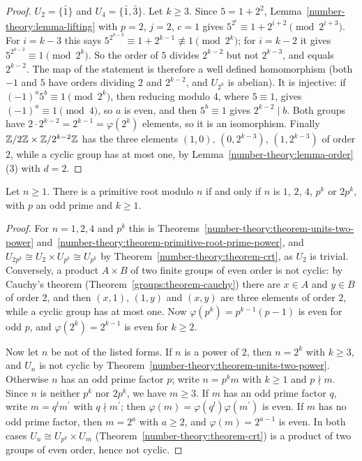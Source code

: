 \begin{proof}
$U_2 = \{\bar{1}\}$ and $U_4 = \{\bar{1}, \bar{3}\}$. Let $k \geq 3$. Since $5 = 1 + 2^2$, Lemma~\ref{number-theory:lemma-lifting} with $p = 2$, $j = 2$, $c = 1$ gives
$5^{2^i} \equiv 1 + 2^{i+2} \pmod{2^{i+3}}$. For $i = k - 3$ this says $5^{2^{k-3}} \equiv 1 + 2^{k-1} \not\equiv 1 \pmod{2^k}$; for $i = k - 2$ it gives $5^{2^{k-2}} \equiv 1 \pmod{2^k}$. So the order of
$5$ divides $2^{k-2}$ but not $2^{k-3}$, and equals $2^{k-2}$. The map of the statement is therefore a well defined homomorphism (both $-1$ and $5$ have orders dividing $2$ and $2^{k-2}$, and $U_{2^k}$ is
abelian). It is injective: if $(-1)^a5^b \equiv 1 \pmod{2^k}$, then reducing modulo $4$, where $5 \equiv 1$, gives $(-1)^a \equiv 1 \pmod 4$, so $a$ is even, and then $5^b \equiv 1$ gives $2^{k-2} \mid b$.
Both groups have $2 \cdot 2^{k-2} = 2^{k-1} = \varphi(2^k)$ elements, so it is an isomorphism. Finally $\mathbb{Z}/2\mathbb{Z} \times \mathbb{Z}/2^{k-2}\mathbb{Z}$ has the three elements $(1, 0)$, $(0, 2^{k-3})$, $(1, 2^{k-3})$ of
order $2$, while a cyclic group has at most one, by Lemma~\ref{number-theory:lemma-order}(3) with $d = 2$.
\end{proof}

\begin{theorem}[Gauss]\label{number-theory:theorem-primitive-roots}
Let $n \geq 1$. There is a primitive root modulo $n$ if and only if $n$ is $1$, $2$, $4$, $p^k$ or $2p^k$, with $p$ an odd prime and $k \geq 1$.
\end{theorem}

\begin{proof}
For $n = 1, 2, 4$ and $p^k$ this is Theorems~\ref{number-theory:theorem-units-two-power} and~\ref{number-theory:theorem-primitive-root-prime-power}, and $U_{2p^k} \cong U_2 \times U_{p^k} \cong U_{p^k}$ by
Theorem~\ref{number-theory:theorem-crt}, as $U_2$ is trivial. Conversely, a product $A \times B$ of two finite groups of even order is not cyclic: by Cauchy's theorem (Theorem~\ref{groups:theorem-cauchy})
there are $x \in A$ and $y \in B$ of order $2$, and then $(x, 1)$, $(1, y)$ and $(x, y)$ are three elements of order $2$, while a cyclic group has at most one. Now $\varphi(p^k) = p^{k-1}(p - 1)$ is even
for odd $p$, and $\varphi(2^k) = 2^{k-1}$ is even for $k \geq 2$.

Now let $n$ be not of the listed forms. If $n$ is a power of $2$, then $n = 2^k$ with $k \geq 3$, and $U_n$ is not cyclic by Theorem~\ref{number-theory:theorem-units-two-power}. Otherwise $n$ has an odd
prime factor $p$; write $n = p^km$ with $k \geq 1$ and $p \nmid m$. Since $n$ is neither $p^k$ nor $2p^k$, we have $m \geq 3$. If $m$ has an odd prime factor $q$, write $m = q^lm^{\prime}$ with
$q \nmid m^{\prime}$; then $\varphi(m) = \varphi(q^l)\varphi(m^{\prime})$ is even. If $m$ has no odd prime factor, then $m = 2^a$ with $a \geq 2$, and $\varphi(m) = 2^{a-1}$ is even. In both cases
$U_n \cong U_{p^k} \times U_m$ (Theorem~\ref{number-theory:theorem-crt}) is a product of two groups of even order, hence not cyclic.
\end{proof}

